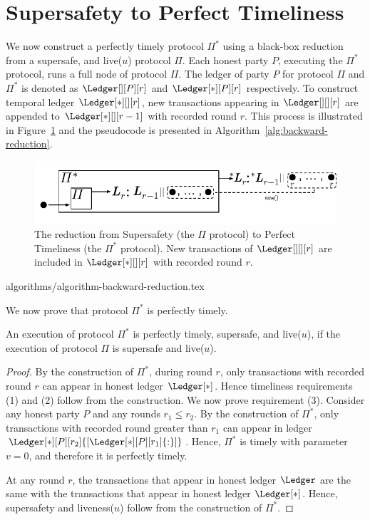 \section{Supersafety to Perfect Timeliness}

We now construct a perfectly timely protocol $\Pi^*$
using a black-box reduction from a supersafe, and live($u$) protocol $\Pi$.
Each honest party $P$, executing the $\Pi^*$ protocol, runs a
full node of protocol $\Pi$.
The ledger of party $P$ for protocol $\Pi$ and $\Pi^*$ is denoted as $\Ledger[][P][r]$ and
$\Ledger[*][P][r]$ respectively.
To construct temporal ledger $\Ledger[*][][r]$,
new transactions appearing in
$\Ledger[][][r]$ are appended to $\Ledger[*][][r - 1]$ with recorded round $r$.
This process is illustrated
in Figure~\ref{fig:backward-reduction}
and the pseudocode is presented in Algorithm~\ref{alg:backward-reduction}.

\begin{figure}
  \centering
  \includegraphics[width=0.9\columnwidth,keepaspectratio]{figures/backward-reduction.pdf}
  \caption{The reduction from Supersafety
    (the $\Pi$ protocol) to Perfect Timeliness (the $\Pi^*$ protocol).
    New transactions of $\Ledger[][][r]$ are included in
    $\Ledger[*][][r]$ with recorded round $r$.
  }
 \label{fig:backward-reduction}
\end{figure}

{algorithms/algorithm-backward-reduction.tex}

We now prove that protocol $\Pi^*$ is perfectly timely.

\begin{theorem}
  An execution of protocol $\Pi^*$ is perfectly timely, supersafe, and live($u$), if the execution of
  protocol $\Pi$ is supersafe and live($u$).
\end{theorem}
\begin{proof}
  By the construction of $\Pi^*$, during round $r$, only transactions with
  recorded round $r$ can appear in honest ledger $\Ledger[*]$.
  Hence timeliness requirements (1) and (2) follow from the construction.
  We now prove requirement (3).
  Consider any honest party $P$ and any rounds $r_1 \leq r_2$.
  By the construction of $\Pi^*$, only transactions with recorded round greater
  than $r_1$ can appear in ledger $\Ledger[*][P][r_2]{[\Ledger[*][P][r_1]{:}]}$.
  Hence, $\Pi^*$ is timely with parameter $v = 0$, and therefore it is perfectly timely.

  At any round $r$, the transactions that appear in honest ledger $\Ledger$
  are the same with the transactions that appear in honest ledger $\Ledger[*]$.
  Hence, supersafety and liveness($u$) follow from the construction of $\Pi^*$.
  \Qed
\end{proof}

